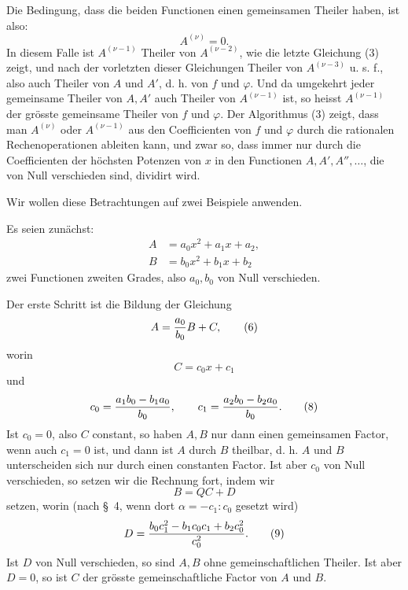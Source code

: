 \documentclass[11pt]{article}
\begin{document}
Die Bedingung, dass die beiden Functionen einen gemeinsamen Theiler haben, ist also:
\begin{equation}
 A^{(\nu)}=0.
\tag{4}
\end{equation}
In diesem Falle ist $A^{(\nu-1)}$ Theiler von $A^{(\nu-2)}$, wie die letzte Gleichung (3) zeigt, und nach der vorletzten dieser Gleichungen Theiler von $A^{(\nu-3)}$ u. s. f., also auch Theiler von $A$ und $A'$, d. h. von $f$ und $\varphi$. Und da umgekehrt jeder gemeinsame Theiler von $A,A'$ auch Theiler von $A^{(\nu-1)}$ ist, so heisst $A^{(\nu-1)}$ der grösste gemeinsame Theiler von $f$ und $\varphi$. Der Algorithmus (3) zeigt, dass man $A^{(\nu)}$ oder $A^{(\nu-1)}$ aus den Coefficienten von $f$ und $\varphi$ durch die rationalen Rechenoperationen ableiten kann, und zwar so, dass immer nur durch die Coefficienten der höchsten Potenzen von $x$ in den Functionen $A,A',A'',\ldots$, die von Null verschieden sind, dividirt wird.

Wir wollen diese Betrachtungen auf zwei Beispiele anwenden.

Es seien zunächst:
\begin{equation}
\begin{aligned}
 A&=a_0x^2+a_1x+a_2,\\
 B&=b_0x^2+b_1x+b_2
\end{aligned}
\tag{5}
\end{equation}
zwei Functionen zweiten Grades, also $a_0,b_0$ von Null verschieden.

Der erste Schritt ist die Bildung der Gleichung
\begin{equation}
 A={a_0\over b_0}B+C,
\tag{6}
\end{equation}
worin
\begin{equation}
 C=c_0x+c_1
\tag{7}
\end{equation}
und
\begin{equation}
 c_0={a_1b_0-b_1a_0\over b_0},\qquad
 c_1={a_2b_0-b_2a_0\over b_0}.
\tag{8}
\end{equation}
Ist $c_0=0$, also $C$ constant, so haben $A,B$ nur dann einen gemeinsamen Factor, wenn auch $c_1=0$ ist, und dann ist $A$ durch $B$ theilbar, d. h. $A$ und $B$ unterscheiden sich nur durch einen constanten Factor. Ist aber $c_0$ von Null verschieden, so setzen wir die Rechnung fort, indem wir
\[
 B=QC+D
\]
setzen, worin (nach \S~4, wenn dort $\alpha=-c_1:c_0$ gesetzt wird)
\begin{equation}
 D={b_0c_1^2-b_1c_0c_1+b_2c_0^2\over c_0^2}.
\tag{9}
\end{equation}
Ist $D$ von Null verschieden, so sind $A,B$ ohne gemeinschaftlichen Theiler. Ist aber $D=0$, so ist $C$ der grösste gemeinschaftliche Factor von $A$ und $B$.
\end{document}
